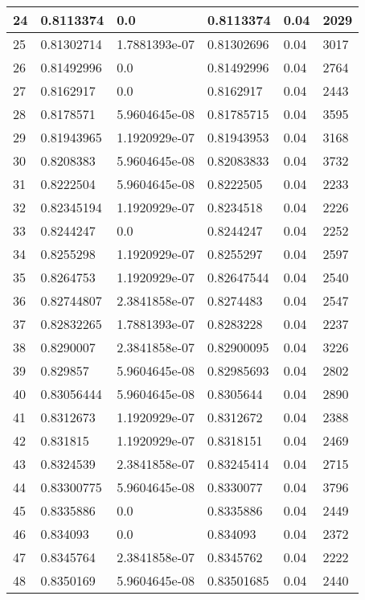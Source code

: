 \begin{longtable}{|l|l|l|l|l|l|}
24 & 0.8113374 & 0.0 & 0.8113374 & 0.04 & 2029 \\ \hline 
25 & 0.81302714 & 1.7881393e-07 & 0.81302696 & 0.04 & 3017 \\ \hline 
26 & 0.81492996 & 0.0 & 0.81492996 & 0.04 & 2764 \\ \hline 
27 & 0.8162917 & 0.0 & 0.8162917 & 0.04 & 2443 \\ \hline 
28 & 0.8178571 & 5.9604645e-08 & 0.81785715 & 0.04 & 3595 \\ \hline 
29 & 0.81943965 & 1.1920929e-07 & 0.81943953 & 0.04 & 3168 \\ \hline 
30 & 0.8208383 & 5.9604645e-08 & 0.82083833 & 0.04 & 3732 \\ \hline 
31 & 0.8222504 & 5.9604645e-08 & 0.8222505 & 0.04 & 2233 \\ \hline 
32 & 0.82345194 & 1.1920929e-07 & 0.8234518 & 0.04 & 2226 \\ \hline 
33 & 0.8244247 & 0.0 & 0.8244247 & 0.04 & 2252 \\ \hline 
34 & 0.8255298 & 1.1920929e-07 & 0.8255297 & 0.04 & 2597 \\ \hline 
35 & 0.8264753 & 1.1920929e-07 & 0.82647544 & 0.04 & 2540 \\ \hline 
36 & 0.82744807 & 2.3841858e-07 & 0.8274483 & 0.04 & 2547 \\ \hline 
37 & 0.82832265 & 1.7881393e-07 & 0.8283228 & 0.04 & 2237 \\ \hline 
38 & 0.8290007 & 2.3841858e-07 & 0.82900095 & 0.04 & 3226 \\ \hline 
39 & 0.829857 & 5.9604645e-08 & 0.82985693 & 0.04 & 2802 \\ \hline 
40 & 0.83056444 & 5.9604645e-08 & 0.8305644 & 0.04 & 2890 \\ \hline 
41 & 0.8312673 & 1.1920929e-07 & 0.8312672 & 0.04 & 2388 \\ \hline 
42 & 0.831815 & 1.1920929e-07 & 0.8318151 & 0.04 & 2469 \\ \hline 
43 & 0.8324539 & 2.3841858e-07 & 0.83245414 & 0.04 & 2715 \\ \hline 
44 & 0.83300775 & 5.9604645e-08 & 0.8330077 & 0.04 & 3796 \\ \hline 
45 & 0.8335886 & 0.0 & 0.8335886 & 0.04 & 2449 \\ \hline 
46 & 0.834093 & 0.0 & 0.834093 & 0.04 & 2372 \\ \hline 
47 & 0.8345764 & 2.3841858e-07 & 0.8345762 & 0.04 & 2222 \\ \hline 
48 & 0.8350169 & 5.9604645e-08 & 0.83501685 & 0.04 & 2440 \\ \hline 

\end{longtable}
